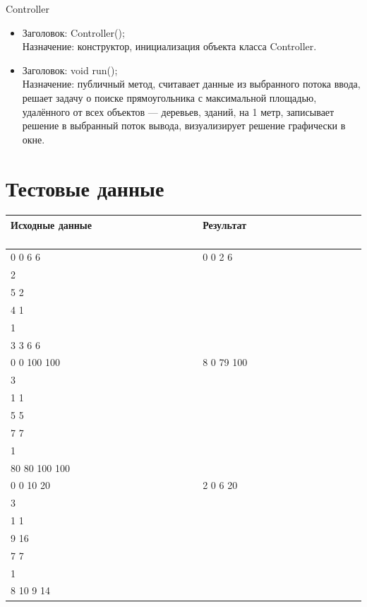 \documentclass[a4paper,12pt]{article}
\begin{document}
{{\begin{center}
Controller
\end{center}
\begin{itemize}
\item Заголовок: Controller(); \\
Назначение: конструктор, инициализация объекта класса Controller.
\item Заголовок: void run(); \\
Назначение: публичный метод, считавает данные из выбранного потока ввода, решает задачу о поиске прямоугольника с максимальной площадью, удалённого от всех объектов — деревьев, зданий, на 1 метр, записывает решение в выбранный поток вывода, визуализирует решение графически в окне.
\end{itemize}
}

\newpage

\section{Тестовые данные} {
\begin{tabular}{ | l | l | }
\hline
Исходные данные $\hspace{5cm}$ & Результат  $\hspace{5cm}$ \\ \hline
0 0 6 6 & 0 0 2 6  \\ 
2 &     \\ 
5 2 &     \\
4 1 &     \\
1 &     \\
3 3 6 6 &     \\ \hline

0 0 100 100 & 8 0 79 100 \\
3 &     \\
1 1 &     \\
5 5 &     \\
7 7 &     \\
1 &     \\
80 80 100 100 &      \\ \hline

0 0 10 20 & 2 0 6 20 \\
3 &     \\
1 1 &     \\
9 16 &     \\
7 7 &     \\
1 &     \\
8 10 9 14 &     \\ \hline
\end{tabular}
}

}
\end{document}
